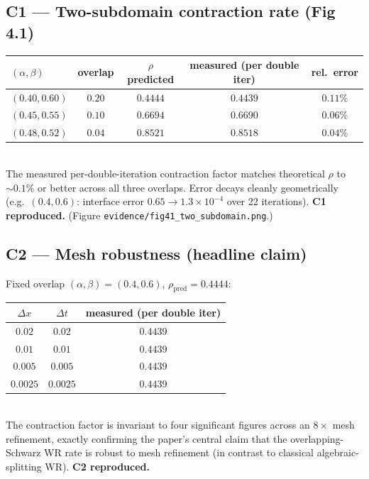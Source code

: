 \documentclass[11pt]{article}
\begin{document}
\subsection*{C1 --- Two-subdomain contraction rate (Fig 4.1)}
\begin{tabular}{lcccc}
\toprule
$(\alpha,\beta)$ & overlap & $\rho$ predicted & measured (per double iter) & rel.\ error \\
\midrule
$(0.40,0.60)$ & $0.20$ & $0.4444$ & $0.4439$ & $0.11\%$ \\
$(0.45,0.55)$ & $0.10$ & $0.6694$ & $0.6690$ & $0.06\%$ \\
$(0.48,0.52)$ & $0.04$ & $0.8521$ & $0.8518$ & $0.04\%$ \\
\bottomrule
\end{tabular}\\[4pt]
The measured per-double-iteration contraction factor matches theoretical $\rho$ to
$\sim 0.1\%$ or better across all three overlaps. Error decays cleanly geometrically
(e.g.\ $(0.4,0.6)$: interface error $0.65 \to 1.3\times 10^{-4}$ over 22 iterations).
\textbf{C1 reproduced.} (Figure \texttt{evidence/fig41\_two\_subdomain.png}.)

\subsection*{C2 --- Mesh robustness (headline claim)}
Fixed overlap $(\alpha,\beta)=(0.4,0.6)$, $\rho_{\text{pred}}=0.4444$:\\[2pt]
\begin{tabular}{ccc}
\toprule
$\Delta x$ & $\Delta t$ & measured (per double iter) \\
\midrule
$0.02$   & $0.02$   & $0.4439$ \\
$0.01$   & $0.01$   & $0.4439$ \\
$0.005$  & $0.005$  & $0.4439$ \\
$0.0025$ & $0.0025$ & $0.4439$ \\
\bottomrule
\end{tabular}\\[4pt]
The contraction factor is invariant to four significant figures across an $8\times$ mesh
refinement, exactly confirming the paper's central claim that the overlapping-Schwarz
WR rate is robust to mesh refinement (in contrast to classical algebraic-splitting WR).
\textbf{C2 reproduced.}
\end{document}
